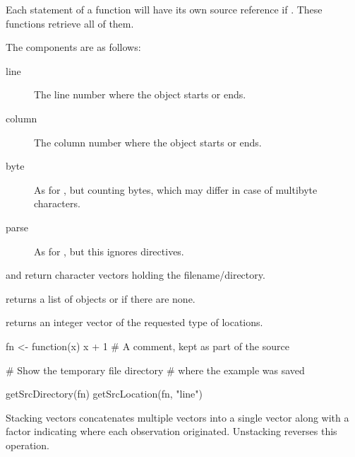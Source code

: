 %
\begin{Details}\relax
Each statement of a function will have its own source reference if
.  These functions retrieve all of them.

The components are as follows:
\begin{description}

\item[line] The line number where the object starts or ends.
\item[column] The column number where the object starts or ends.
\item[byte] As for , but counting bytes, which may
differ in case of multibyte characters.
\item[parse] As for , but this ignores  directives.

\end{description}

\end{Details}
%
\begin{Value}
 and  return character vectors 
holding the filename/directory.

 returns a list of  objects or
 if there are none.

 returns an integer vector of the requested type
of locations.
\end{Value}
%
\begin{SeeAlso}\relax
{}
\end{SeeAlso}
%
\begin{Examples}
\begin{ExampleCode}
fn <- function(x) {
  x + 1 # A comment, kept as part of the source
}			    

# Show the temporary file directory
# where the example was saved

getSrcDirectory(fn)  
getSrcLocation(fn, "line")
\end{ExampleCode}
\end{Examples}
%
\begin{Description}\relax
Stacking vectors concatenates multiple vectors into a single vector
along with a factor indicating where each observation originated.
Unstacking reverses this operation.
\end{Description}
